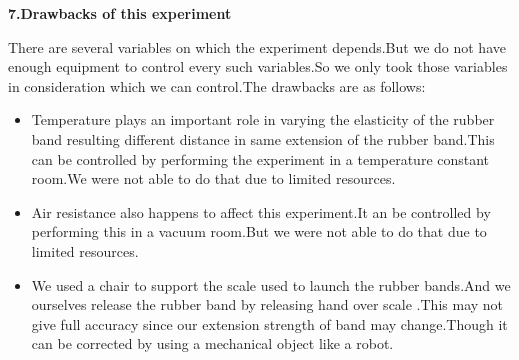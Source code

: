 \begin{center}
\textbf{{\huge 7.Drawbacks of this experiment}}
\end{center}
\vspace{5 mm}
There are several variables on which the experiment depends.But we do not have enough equipment to control
every such variables.So we only took those variables in consideration which we can control.The drawbacks are as follows:
\begin{itemize}
\item Temperature plays an important role in varying the elasticity of the rubber band resulting different distance in same extension of the rubber band.This can  be controlled by performing the experiment in a temperature constant room.We were not able to do that due to limited resources.
\item Air resistance also happens to affect this experiment.It an be controlled by performing this in a vacuum room.But we were not able to do that due to limited resources.
\item We used a chair to support the scale used to launch the rubber bands.And we ourselves release the rubber band by releasing hand over scale .This may not give full accuracy since our extension strength of band may change.Though it can be corrected by using a mechanical object like a robot.
\end{itemize}



